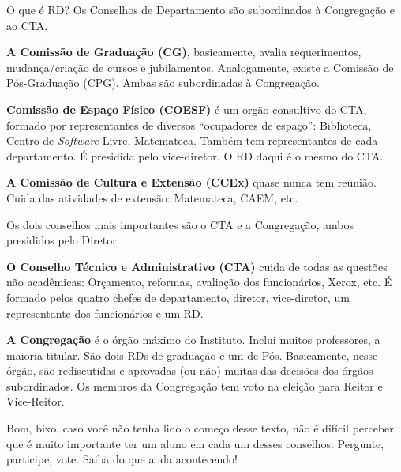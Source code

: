 \begin{secao}{O que é RD?}
Os Conselhos de Departamento são subordinados à Congregação e ao CTA.

{\bf A Comissão de Graduação (CG)}, basicamente, avalia requerimentos,
mudança/criação de cursos e jubilamentos. Analogamente, existe a Comissão de
Pós-Graduação (CPG). Ambas são subordinadas à Congregação.

{\bf Comissão de Espaço Físico (COESF)} é um orgão consultivo do CTA, formado
por representantes de diversos ``ocupadores de espaço'': Biblioteca, Centro de
\textit{Software} Livre, Matemateca. Também tem representantes de cada departamento. É
presidida pelo vice-diretor. O RD daqui é o mesmo do CTA.

{\bf A Comissão de Cultura e Extensão (CCEx)} quase nunca tem reunião. Cuida
das atividades de extensão: Matemateca, CAEM, etc.

Os dois conselhos mais importantes são o CTA e a Congregação, ambos presididos
pelo Diretor.

{\bf O Conselho Técnico e Administrativo (CTA)} cuida de todas as questões não
acadêmicas: Orçamento, reformas, avaliação dos funcionários, Xerox, etc. É 
formado pelos quatro chefes de departamento, diretor, vice-diretor, um
representante dos funcionários e um RD.

{\bf A Congregação} é o órgão máximo do Instituto. Inclui muitos professores, a
maioria titular. São dois RDs de graduação e um de Pós. Basicamente,
nesse órgão, são rediscutidas e aprovadas (ou não) muitas das decisões
dos órgãos subordinados. Os membros da Congregação tem voto na eleição para
Reitor e Vice-Reitor.

Bom, bixo, caso você não tenha lido o começo desse texto, não é difícil
perceber que é muito importante ter um aluno em cada um desses conselhos.
Pergunte, participe, vote. Saiba do que anda acontecendo!
\end{secao}
